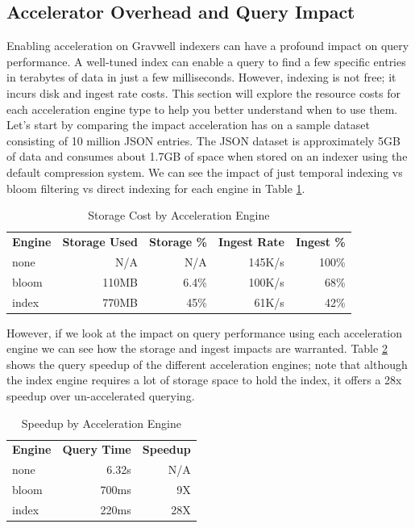 {\subsection{Accelerator Overhead and Query Impact}

Enabling acceleration on Gravwell indexers can have a profound impact
on query performance. A well-tuned index can enable a query to find a
few specific entries in terabytes of data in just a few milliseconds.
However, indexing is not free; it incurs disk and ingest rate costs.
This section will explore the resource costs for each acceleration
engine type to help you better understand when to use them. Let's start
by comparing the impact acceleration has on a sample dataset consisting
of 10 million JSON entries. The JSON dataset is approximately 5GB of
data and consumes about 1.7GB of space when stored on an indexer using
the default compression system. We can see the impact of just temporal
indexing vs bloom filtering vs direct indexing for each engine in Table \ref{table:accel-storage}.

\begin{table}
\begin{tabular}{lrrrr}
	\hline
	\textbf{Engine} & \textbf{Storage Used} & \textbf{Storage \%} & \textbf{Ingest Rate} & \textbf{Ingest \%} \\
	none & N/A & N/A & 145K/s & 100\% \\
	bloom & 110MB & 6.4\% & 100K/s & 68\% \\
	index & 770MB & 45\% & 61K/s & 42\% \\
	\hline
\end{tabular}
\caption{Storage Cost by Acceleration Engine}
\label{table:accel-storage}
\end{table}

However, if we look at the impact on query performance using each
acceleration engine we can see how the storage and ingest impacts are
warranted. Table \ref{table:accel-speedup} shows the query speedup of
the different acceleration engines; note that although the index engine
requires a lot of storage space to hold the index, it offers a 28x speedup
over un-accelerated querying.

\begin{table}
\begin{tabular}{lrr}
	\hline
	\textbf{Engine} & \textbf{Query Time} & \textbf{Speedup} \\
	none & 6.32s & N/A \\
	bloom & 700ms & 9X \\
	index & 220ms & 28X \\
	\hline
\end{tabular}
\caption{Speedup by Acceleration Engine}
\label{table:accel-speedup}
\end{table}

}
